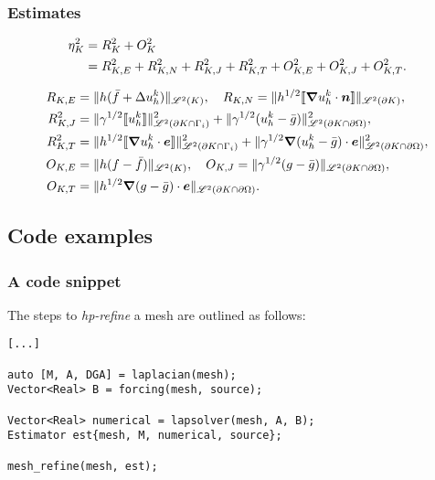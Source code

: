 \begin{frame}[fragile]
    \frametitle{Estimates}

    \begin{align}
        \eta_K^2 &= R_K^2 + O_K^2 \notag \\
        &= R_{K, E}^2 + R_{K, N}^2 + R_{K, J}^2 + R_{K, T}^2 + O_{K, E}^2 + O_{K, J}^2 + O_{K, T}^2. \notag
    \end{align}

    \begin{align}
        R_{K, E} &= \lVert h (\bar{f} + \Delta u^k_h) \rVert_{\mathscr{L}^2(K)}, \quad R_{K, N} = \lVert h^{1/2} \llbracket \bm{\nabla} u^k_h \cdot \bm{n} \rrbracket \rVert_{\mathscr{L}^2(\partial K)}, \notag \\
        R^2_{K, J} &= \lVert \gamma^{1/2} \llbracket u^k_h \rrbracket \rVert^2_{\mathscr{L}^2(\partial K \cap \Gamma_{i})} + \lVert \gamma^{1/2} (u^k_h - \bar{g}) \rVert^2_{\mathscr{L}^2(\partial K \cap \partial \Omega)}, \notag \\
        R^2_{K, T} &= \lVert h^{1/2} \llbracket \bm{\nabla} u^k_h \cdot \bm{e} \rrbracket \rVert^2_{\mathscr{L}^2(\partial K \cap \Gamma_{i})} + \lVert \gamma^{1/2} \bm{\nabla} (u^k_h - \bar{g}) \cdot \bm{e} \rVert^2_{\mathscr{L}^2(\partial K \cap \partial \Omega)}, \notag \\
        O_{K, E} &= \lVert h (f - \bar{f}) \rVert_{\mathscr{L}^2(K)}, \quad O_{K, J} = \lVert \gamma^{1/2} (g - \bar{g}) \rVert_{\mathscr{L}^2(\partial K \cap \partial \Omega)}, \notag \\
        O_{K, T} &= \lVert h^{1/2} \bm{\nabla} (g - \bar{g}) \cdot \bm{e} \rVert_{\mathscr{L}^2(\partial K \cap \partial \Omega)}. \notag
    \end{align}

\end{frame}

\subsection{Code examples}

\begin{frame}[fragile]
    \frametitle{A code snippet}

    The steps to \textit{hp-refine} a mesh are outlined as follows:

\begin{lstlisting}[style=cpp]
[...]

auto [M, A, DGA] = laplacian(mesh);
Vector<Real> B = forcing(mesh, source);

Vector<Real> numerical = lapsolver(mesh, A, B);
Estimator est{mesh, M, numerical, source};

mesh_refine(mesh, est);
\end{lstlisting}

\end{frame}